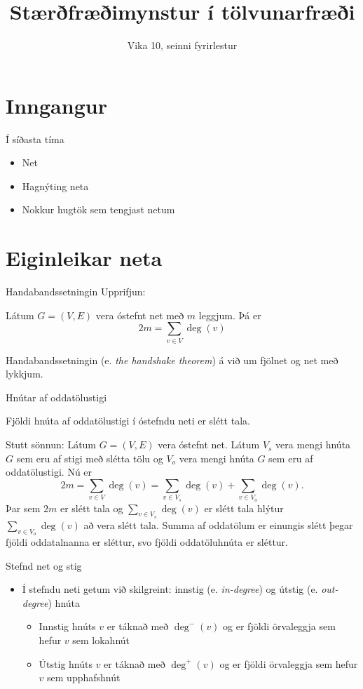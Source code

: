 \documentclass[handout]{beamer}
\title{Stærðfræðimynstur í tölvunarfræði}
\subtitle{Vika 10, seinni fyrirlestur}
\begin{document}
\begin{frame}
\titlepage
\end{frame}


\section{Inngangur}

\begin{frame}{Í síðasta tíma}
\begin{itemize}
 \item Net
 \item Hagnýting neta
 \item Nokkur hugtök sem tengjast netum
\end{itemize}
\end{frame}

\section{Eiginleikar neta}

\begin{frame}{Handabandssetningin}
Upprifjun:
\begin{tcolorbox}[title=Handabandssetningin]
Látum $G = (V, E)$ vera óstefnt net með $m$ leggjum. Þá er
\[
 2m = \sum_{v \in V} \deg(v)
\]
\end{tcolorbox}
Handabandssetningin (e. \emph{the handshake theorem}) á við um fjölnet og net með lykkjum.
\end{frame}

\begin{frame}{Hnútar af oddatölustigi}
\begin{tcolorbox}
Fjöldi hnúta af oddatölustigi í óstefndu neti er slétt tala.
\end{tcolorbox}

Stutt sönnun: Látum $G = (V,E)$ vera óstefnt net. Látum $V_s$ vera mengi hnúta $G$ sem eru af stigi með slétta tölu og $V_o$ vera mengi hnúta $G$ sem eru af oddatölustigi. Nú er
\[
 2m = \sum_{v \in V} \deg(v) = \sum_{v \in V_s} \deg(v) + \sum_{v \in V_o} \deg(v).
\]
Þar sem $2m$ er slétt tala og $\sum_{v \in V_s} \deg(v)$ er slétt tala hlýtur $\sum_{v \in V_o} \deg(v)$ að vera slétt tala. Summa af oddatölum er einungis slétt þegar fjöldi oddatalnanna er sléttur, svo fjöldi oddatöluhnúta er sléttur.
\end{frame}

\begin{frame}{Stefnd net og stig}
\begin{itemize}
 \item Í stefndu neti getum við skilgreint: innstig (e. \emph{in-degree}) og útstig (e. \emph{out-degree}) hnúta
 \begin{itemize}
  \item Innstig hnúts $v$ er táknað með $\deg^-(v)$ og er fjöldi örvaleggja sem hefur $v$ sem lokahnút
  \item Útstig hnúts $v$ er táknað með $\deg^+(v)$ og er fjöldi örvaleggja sem hefur $v$ sem upphafshnút
 \end{itemize}
\end{itemize}
\end{frame}
\end{document}
